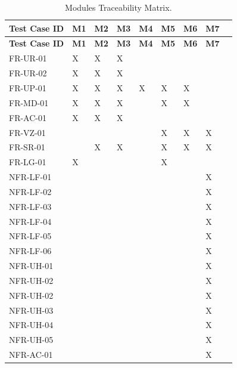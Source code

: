 \documentclass[12pt, titlepage]{article}
\begin{document}
\renewcommand{\arraystretch}{1.3} %
\begin{longtable}{|p{3.5cm}|p{1cm}|p{1cm}|p{1cm}|p{1cm}|p{1cm}|p{1cm}|p{1cm}|p{1cm}}
\caption{Modules Traceability Matrix.} \label{tab:long} \\
    \hline
    \textbf{Test Case ID} & \textbf{M1} & \textbf{M2} & \textbf{M3} & \textbf{M4} & \textbf{M5} & \textbf{M6} & \textbf{M7}\\
    \hline
    \endfirsthead
    
    \hline
    \textbf{Test Case ID} & \textbf{M1} & \textbf{M2} & \textbf{M3} & \textbf{M4} & \textbf{M5} & \textbf{M6} & \textbf{M7}\\
    \hline
    \endhead

    FR-UR-01  & X & X & X & & & &\\\hline
    FR-UR-02 & X & X & X & & & & \\\hline
    FR-UP-01 & X & X & X & X & X & X & \\\hline
    FR-MD-01 & X & X & X &  & X & X &  \\\hline
    FR-AC-01  & X & X & X &  &  &  &  \\\hline
    FR-VZ-01  &  &  &  &  & X & X & X \\\hline
    FR-SR-01  &  & X & X &  & X & X & X \\\hline
    FR-LG-01  & X &  &  &  & X &  &  \\\hline
    NFR-LF-01  &  &  &  &  &  &  & X \\\hline
    NFR-LF-02  &  &  &  &  &  &  & X \\\hline
    NFR-LF-03  &  &  &  &  &  &  & X \\\hline
    NFR-LF-04  &  &  &  &  &  &  & X \\\hline
    NFR-LF-05  &  &  &  &  &  &  & X \\\hline
    NFR-LF-06  &  &  &  &  &  &  & X \\\hline
    NFR-UH-01  &  &  &  &  &  &  & X \\\hline
    NFR-UH-02  &  &  &  &  &  &  & X \\\hline
    NFR-UH-02  &  &  &  &  &  &  & X \\\hline
    NFR-UH-03  &  &  &  &  &  &  & X \\\hline
    NFR-UH-04  &  &  &  &  &  &  & X \\\hline
    NFR-UH-05  &  &  &  &  &  &  & X \\\hline
    NFR-AC-01  &  &  &  &  &  &  & X \\\hline

\end{longtable}
\end{document}
